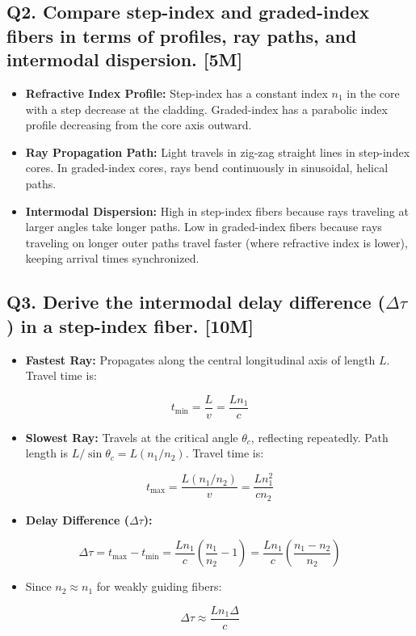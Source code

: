 \subsection{Q2. Compare step-index and graded-index fibers in terms of profiles, ray paths, and intermodal dispersion. [5M]}
\begin{itemize}
  \item   \textbf{Refractive Index Profile:} Step-index has a constant index $n_1$ in the core with a step decrease at the cladding. Graded-index has a parabolic index profile decreasing from the core axis outward.
  \item   \textbf{Ray Propagation Path:} Light travels in zig-zag straight lines in step-index cores. In graded-index cores, rays bend continuously in sinusoidal, helical paths.
  \item   \textbf{Intermodal Dispersion:} High in step-index fibers because rays traveling at larger angles take longer paths. Low in graded-index fibers because rays traveling on longer outer paths travel faster (where refractive index is lower), keeping arrival times synchronized.
\end{itemize}

\subsection{Q3. Derive the intermodal delay difference ($\Delta\tau$) in a step-index fiber. [10M]}
\begin{itemize}
  \item   \textbf{Fastest Ray:} Propagates along the central longitudinal axis of length $L$. Travel time is:
\end{itemize}
    \[ t_{\text{min}} = \frac{L}{v} = \frac{L n_1}{c} \]
\begin{itemize}
  \item   \textbf{Slowest Ray:} Travels at the critical angle $\theta_c$, reflecting repeatedly. Path length is $L/\sin \theta_c = L(n_1/n_2)$. Travel time is:
\end{itemize}
    \[ t_{\text{max}} = \frac{L (n_1/n_2)}{v} = \frac{L n_1^2}{c n_2} \]
\begin{itemize}
  \item   \textbf{Delay Difference ($\Delta\tau$):}
\end{itemize}
    \[ \Delta\tau = t_{\text{max}} - t_{\text{min}} = \frac{L n_1}{c} \left(\frac{n_1}{n_2} - 1\right) = \frac{L n_1}{c} \left(\frac{n_1 - n_2}{n_2}\right) \]
\begin{itemize}
  \item   Since $n_2 \approx n_1$ for weakly guiding fibers:
\end{itemize}
    \[ \Delta\tau \approx \frac{L n_1 \Delta}{c} \]

